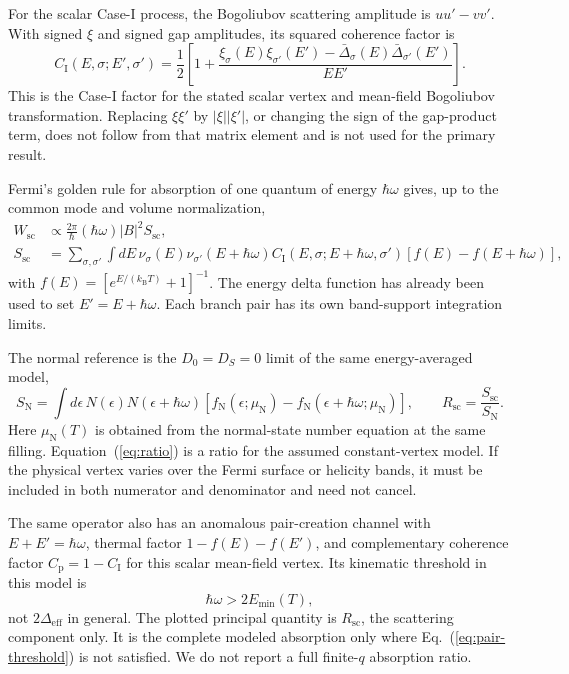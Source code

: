 \documentclass[aps,prb,preprint,superscriptaddress]{revtex4-2}
\newcommand{\kb}{k_{\mathrm B}}
\newcommand{\Dbar}{\bar\Delta}
\newcommand{\Emin}{E_{\min}}
\newcommand{\Wsc}{W_{\mathrm{sc}}}
\newcommand{\Rsc}{R_{\mathrm{sc}}}
\begin{document}
For the scalar Case-I process, the Bogoliubov scattering amplitude is $u u'-v v'$. With signed $\xi$ and signed gap amplitudes, its squared coherence factor is
\begin{equation}
 C_{\mathrm{I}}(E,\sigma;E',\sigma')
 =\frac12\left[1+\frac{\xi_\sigma(E)\xi_{\sigma'}(E')-
 \Dbar_\sigma(E)\Dbar_{\sigma'}(E')}{EE'}\right].
 \label{eq:coherence}
\end{equation}
This is the Case-I factor for the stated scalar vertex and mean-field Bogoliubov transformation. Replacing $\xi\xi'$ by $|\xi||\xi'|$, or changing the sign of the gap-product term, does not follow from that matrix element and is not used for the primary result.

Fermi's golden rule for absorption of one quantum of energy $\hbar\omega$ gives, up to the common mode and volume normalization,
\begin{align}
 \Wsc &\propto \frac{2\pi}{\hbar}(\hbar\omega)|B|^2 S_{\mathrm{sc}},\\
 S_{\mathrm{sc}}&=\sum_{\sigma,\sigma'}\int dE\,
 \nu_\sigma(E)\nu_{\sigma'}(E+\hbar\omega)
 C_{\mathrm I}(E,\sigma;E+\hbar\omega,\sigma')
 [f(E)-f(E+\hbar\omega)],
 \label{eq:scattering-integral}
\end{align}
with $f(E)=[e^{E/(\kb T)}+1]^{-1}$. The energy delta function has already been used to set $E'=E+\hbar\omega$. Each branch pair has its own band-support integration limits.

The normal reference is the $D_0=D_S=0$ limit of the same energy-averaged model,
\begin{equation}
 S_{\mathrm N}=\int d\epsilon\,N(\epsilon)N(\epsilon+\hbar\omega)
 [f_{\mathrm N}(\epsilon;\mu_{\mathrm N})-f_{\mathrm N}(\epsilon+\hbar\omega;\mu_{\mathrm N})],
 \qquad
 \Rsc=\frac{S_{\mathrm{sc}}}{S_{\mathrm N}}.
 \label{eq:ratio}
\end{equation}
Here $\mu_{\mathrm N}(T)$ is obtained from the normal-state number equation at the same filling. Equation~(\ref{eq:ratio}) is a ratio for the assumed constant-vertex model. If the physical vertex varies over the Fermi surface or helicity bands, it must be included in both numerator and denominator and need not cancel.

The same operator also has an anomalous pair-creation channel with $E+E'=\hbar\omega$, thermal factor $1-f(E)-f(E')$, and complementary coherence factor $C_{\mathrm p}=1-C_{\mathrm I}$ for this scalar mean-field vertex. Its kinematic threshold in this model is
\begin{equation}
 \hbar\omega>2\Emin(T),
 \label{eq:pair-threshold}
\end{equation}
not $2\Delta_{\mathrm{eff}}$ in general. The plotted principal quantity is $\Rsc$, the scattering component only. It is the complete modeled absorption only where Eq.~(\ref{eq:pair-threshold}) is not satisfied. We do not report a full finite-$q$ absorption ratio.
\end{document}
